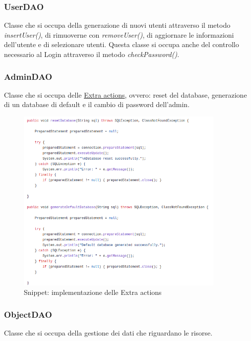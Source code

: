 \documentclass{article}
\begin{document}
\subsubsection{UserDAO}\label{subsubsec:userDAO}
Classe che si occupa della generazione di nuovi utenti attraverso il metodo \textit{insertUser()}, di rimuoverne con \textit{removeUser()}, di aggiornare le informazioni dell'utente e di selezionare utenti. Questa classe si occupa anche del controllo necessario al Login attraverso il metodo \textit{checkPassword()}.
\subsubsection{AdminDAO}\label{subsubsec:adminDAO}
Classe che si occupa delle \hyperref[subsec:navigation-diagram]{Extra actions}, ovvero: reset del database, generazione di un database di default e il cambio di password dell'admin.
\begin{figure}[H]
                \centering
                \includegraphics[width=0.9\textwidth]{Images/Snippets/AdminDAO.png}
                \captionsetup{labelformat=empty,labelsep=none}
                \caption{Snippet: implementazione delle Extra actions}
                \label{fig:snippetadmindao}
            \end{figure}
\subsubsection{ObjectDAO}\label{subsubsec:objectDAO}
Classe che si occupa della gestione dei dati che riguardano le risorse.
\end{document}
